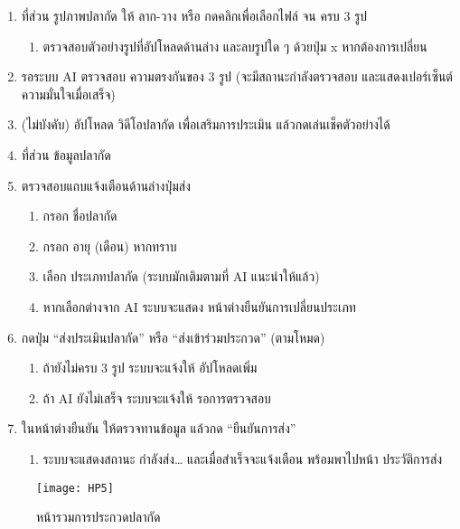 \par


\begin{sloppypar}
	\begin{enumerate}
		\item ที่ส่วน รูปภาพปลากัด ให้ ลาก-วาง หรือ กดคลิกเพื่อเลือกไฟล์ จน ครบ 3 รูป
		\begin{enumerate}
			\item ตรวจสอบตัวอย่างรูปที่อัปโหลดด้านล่าง และลบรูปใด ๆ ด้วยปุ่ม x หากต้องการเปลี่ยน
		\end{enumerate}
		\item รอระบบ AI ตรวจสอบ ความตรงกันของ 3 รูป (จะมีสถานะกำลังตรวจสอบ และแสดงเปอร์เซ็นต์ความมั่นใจเมื่อเสร็จ)
		\item (ไม่บังคับ) อัปโหลด วิดีโอปลากัด เพื่อเสริมการประเมิน แล้วกดเล่นเช็คตัวอย่างได้
		\item ที่ส่วน ข้อมูลปลากัด
		\item ตรวจสอบแถบแจ้งเตือนด้านล่างปุ่มส่ง
		\begin{enumerate}
			\item กรอก ชื่อปลากัด
			\item กรอก อายุ (เดือน) หากทราบ
			\item เลือก ประเภทปลากัด (ระบบมักเติมตามที่ AI แนะนำให้แล้ว)
			\item หากเลือกต่างจาก AI ระบบจะแสดง หน้าต่างยืนยันการเปลี่ยนประเภท
		\end{enumerate}
		\item กดปุ่ม “ส่งประเมินปลากัด” หรือ “ส่งเข้าร่วมประกวด” (ตามโหมด)
		\begin{enumerate}
			\item ถ้ายังไม่ครบ 3 รูป  ระบบจะแจ้งให้ อัปโหลดเพิ่ม
			\item ถ้า AI ยังไม่เสร็จ  ระบบจะแจ้งให้ รอการตรวจสอบ
		\end{enumerate}
		\item ในหน้าต่างยืนยัน ให้ตรวจทานข้อมูล แล้วกด “ยืนยันการส่ง”
		\begin{enumerate}
			\item ระบบจะแสดงสถานะ กำลังส่ง… และเมื่อสำเร็จจะแจ้งเตือน พร้อมพาไปหน้า ประวัติการส่ง
		\end{enumerate}
	\end{enumerate}
\end{sloppypar}

\newpage

\begin{figure}[h]
	\centering
	\texttt{[image: HP5]}
	\caption{หน้ารวมการประกวดปลากัด}
\end{figure}

